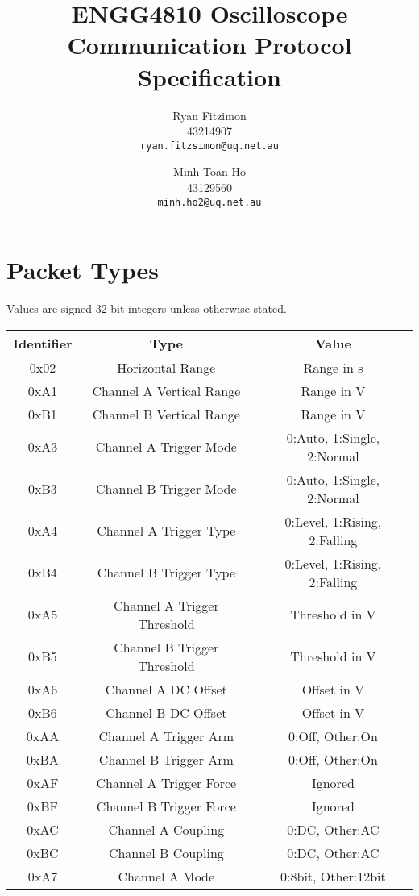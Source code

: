 \documentclass[]{article}
\title{ENGG4810 Oscilloscope Communication Protocol Specification}
\author{
	Ryan Fitzimon\\
	43214907\\
	\texttt{ryan.fitzsimon@uq.net.au}
	\and
	Minh Toan Ho\\
	43129560\\
	\texttt{minh.ho2@uq.net.au}
}
\begin{document}
\maketitle

\section{Packet Types}

Values are signed 32 bit integers unless otherwise stated.

\begin{table}[H]
	\renewcommand{\arraystretch}{1.2}
	\centering
	\begin{tabular}{|c|c|c|}
		\hline
		\textbf{Identifier} & \textbf{Type} & \textbf{Value} \\ \hline
		0x02 & Horizontal Range & Range in \textmu s \\ \hline
		0xA1 & Channel A Vertical Range & Range in \textmu V \\ \hline
		0xB1 & Channel B Vertical Range & Range in \textmu V \\ \hline
		0xA3 & Channel A Trigger Mode & 0:Auto, 1:Single, 2:Normal \\ \hline
		0xB3 & Channel B Trigger Mode & 0:Auto, 1:Single, 2:Normal \\ \hline
		0xA4 & Channel A Trigger Type & 0:Level, 1:Rising, 2:Falling \\ \hline
		0xB4 & Channel B Trigger Type & 0:Level, 1:Rising, 2:Falling \\ \hline
		0xA5 & Channel A Trigger Threshold & Threshold in \textmu V \\ \hline
		0xB5 & Channel B Trigger Threshold & Threshold in \textmu V \\ \hline
		0xA6 & Channel A DC Offset & Offset in \textmu V \\ \hline
		0xB6 & Channel B DC Offset & Offset in \textmu V \\ \hline
		0xAA & Channel A Trigger Arm & 0:Off, Other:On \\ \hline 
		0xBA & Channel B Trigger Arm & 0:Off, Other:On \\ \hline 
		0xAF & Channel A Trigger Force & Ignored \\ \hline 
		0xBF & Channel B Trigger Force & Ignored \\ \hline 
		0xAC & Channel A Coupling & 0:DC, Other:AC \\ \hline
		0xBC & Channel B Coupling & 0:DC, Other:AC \\ \hline
		0xA7 & Channel A Mode & 0:8bit, Other:12bit \\ \hline

\end{tabular}
\end{table}
\end{document}
